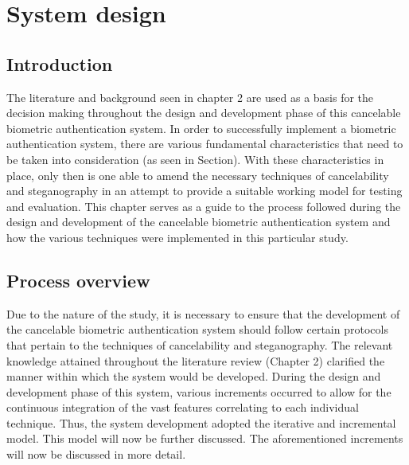 \chapter{System design}

\ifpdf
    \graphicspath{{Chapter3/Figs/Raster/}{Chapter3/Figs/PDF/}{Chapter3/Figs/}}
\else
    \graphicspath{{Chapter3/Figs/Vector/}{Chapter3/Figs/}}
\fi

\section{Introduction}

The literature and background seen in chapter 2 are used as a basis for the decision making throughout the design and development phase of this cancelable biometric authentication system. 
In order to successfully implement a biometric authentication system, there are various fundamental characteristics that need to be taken into consideration (as seen in Section). With these characteristics in place, only then is one able to amend the necessary techniques of cancelability and steganography in an attempt to provide a suitable working model for testing and evaluation. 
This chapter serves as a guide to the process followed during the design and development of the cancelable biometric authentication system and how the various techniques were implemented in this particular study.


\section{Process overview}

Due to the nature of the study, it is necessary to ensure that the development of the cancelable biometric authentication system should follow certain protocols that pertain to the techniques of cancelability and steganography. The relevant knowledge attained throughout the literature review (Chapter 2) clarified the manner within which the system would be developed. During the design and development phase of this system, various increments occurred to allow for the continuous integration of the vast features correlating to each individual technique. Thus, the system development adopted the iterative and incremental model. This model will now be further discussed. The aforementioned increments will now be discussed in more detail.

